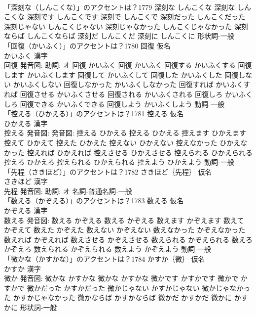 \documentclass[8pt]{extreport}
\begin{document}
\begin{CJK}{UTF8}{min}
\\	「深刻な（しんこくな）」のアクセントは？1779		深刻な しんこくな		深刻な しんこくな 深刻です しんこくです 深刻で しんこくで 深刻だった しんこくだった 深刻じゃない しんこくじゃない 深刻じゃなかった しんこくじゃなかった 深刻ならば しんこくならば 深刻だ しんこくだ 深刻に しんこくに				形状詞-一般 
\\	「回復（かいふく）」のアクセントは？1780	回復 仮名　
\\	かいふく 漢字　
\\	回復 発音図: 助詞: オ	回復 かいふく		回復 かいふく 回復する かいふくする 回復します かいふくします 回復して かいふくして 回復した かいふくした 回復しない かいふくしない 回復しなかった かいふくしなかった 回復すれば かいふくすれば 回復させる かいふくさせる 回復される かいふくされる 回復しろ かいふくしろ 回復できる かいふくできる 回復しよう かいふくしよう				動詞-一般 
\\	「控える（ひかえる）」のアクセントは？1781	控える 仮名　
\\	ひかえる 漢字　
\\	控える 発音図: 発音図:	控える ひかえる		控える ひかえる 控えます ひかえます 控えて ひかえて 控えた ひかえた 控えない ひかえない 控えなかった ひかえなかった 控えれば ひかえれば 控えさせる ひかえさせる 控えられる ひかえられる 控えろ ひかえろ 控えられる ひかえられる 控えよう ひかえよう				動詞-一般 
\\	「先程（さきほど）」のアクセントは？1782	さきほど｛先程｝ 仮名　
\\	さきほど 漢字　
\\	先程 発音図: 助詞: オ							名詞-普通名詞-一般 
\\	「数える（かぞえる）」のアクセントは？1783	数える 仮名　
\\	かぞえる 漢字　
\\	数える 発音図:	数える かぞえる		数える かぞえる 数えます かぞえます 数えて かぞえて 数えた かぞえた 数えない かぞえない 数えなかった かぞえなかった 数えれば かぞえれば 数えさせる かぞえさせる 数えられる かぞえられる 数えろ かぞえろ 数えられる かぞえられる 数えよう かぞえよう				動詞-一般 
\\	「微かな（かすかな）」のアクセントは？1784	かすか｛微｝ 仮名　
\\	かすか 漢字　
\\	微か 発音図:	微かな かすかな		微かな かすかな 微かです かすかです 微かで かすかで 微かだった かすかだった 微かじゃない かすかじゃない 微かじゃなかった かすかじゃなかった 微かならば かすかならば 微かだ かすかだ 微かに かすかに				形状詞-一般 

\end{CJK}
\end{document}
